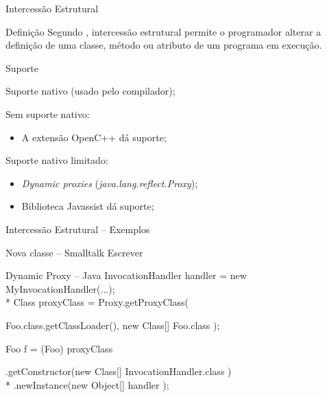 \documentclass[12pt,t]{beamer}
\begin{document}
 	 \begin{frame}{Intercessão Estrutural}
 	 	\begin{block}{Definição}
 	 		Segundo , intercessão estrutural permite o programador alterar a definição de uma classe, método ou atributo de um programa em execução.
 	 	\end{block} 	 	
 	 	\begin{block}{Suporte}
 	 		\begin{description}[Smalltalk:]
 	 			\item [Smalltalk:] Suporte nativo (usado pelo compilador);
 	 			\item [C++:] Sem suporte nativo:  
 	 				\begin{itemize}
		 	 			\item A extensão OpenC++ \cite{chiba1995metaobject} dá suporte;
		 	 		\end{itemize}
 	 			\item [Java:] Suporte nativo limitado:
	 	 			\begin{itemize}
	 	 				\item \emph{Dynamic proxies} (\emph{java.lang.reflect.Proxy});
	 	 				\item Biblioteca Javassist \cite{chiba2000load} dá suporte;
	 	 			\end{itemize}
 	 		\end{description}
 	 	\end{block}
 	 \end{frame}
 	 \begin{frame}{Intercessão Estrutural -- Exemplos}
 	 	\begin{exampleblock}{Nova classe -- Smalltalk}
 	 		\alert{Escrever}
 	 	\end{exampleblock}
 	 	\begin{exampleblock}{Dynamic Proxy -- Java}
 	 		InvocationHandler handler = new MyInvocationHandler(...);\\*
		    Class proxyClass = Proxy.getProxyClass(
	    	\begin{adjustwidth}{2.5em}{0pt}
		        Foo.class.getClassLoader(), new Class[] { Foo.class });
	        \end{adjustwidth}
		    Foo f = (Foo) proxyClass
		    \begin{adjustwidth}{2.5em}{0pt}
		        .getConstructor(new Class[] { InvocationHandler.class }) \\*
		        .newInstance(new Object[] { handler });
	        \end{adjustwidth}
 	 	\end{exampleblock}
 	 \end{frame}
\end{document}
